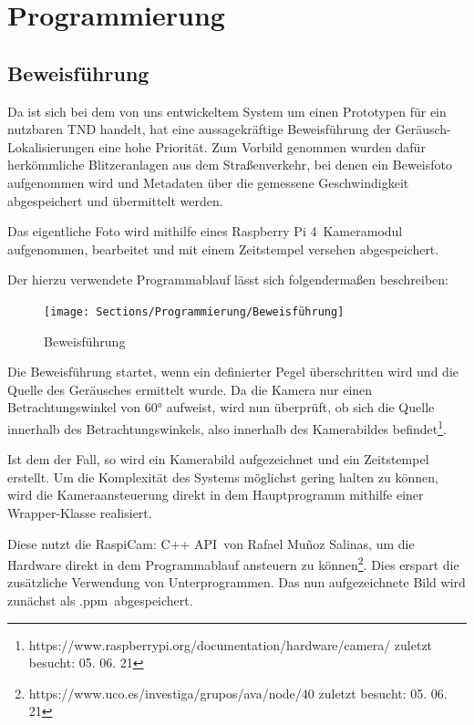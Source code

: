 \section{Programmierung}

\subsection{Beweisführung}

Da ist sich bei dem von uns entwickeltem System um einen Prototypen für ein nutzbaren TND handelt, hat eine aussagekräftige Beweisführung der Geräusch-Lokalisierungen eine hohe Priorität. Zum Vorbild genommen wurden dafür herkömmliche Blitzeranlagen aus dem Straßenverkehr, bei denen ein Beweisfoto aufgenommen wird und Metadaten über die gemessene Geschwindigkeit abgespeichert und übermittelt werden.

Das eigentliche Foto wird mithilfe eines \glqq Raspberry Pi 4\grqq\ Kameramodul aufgenommen, bearbeitet und mit einem Zeitstempel versehen abgespeichert. 

Der hierzu verwendete Programmablauf lässt sich folgendermaßen beschreiben: 

\begin{figure}[!h]
	\begin{center}
		\texttt{[image: Sections/Programmierung/Beweisführung]}
	\end{center}
	\caption{Beweisführung}
	\label{fig:Beweisführung}
\end{figure}

Die Beweisführung startet, wenn ein definierter Pegel überschritten wird und die Quelle des Geräusches ermittelt wurde. Da die Kamera nur einen Betrachtungswinkel von \ang{60} aufweist, wird nun überprüft, ob sich die Quelle innerhalb des Betrachtungswinkels, also innerhalb des Kamerabildes befindet\footnote{https://www.raspberrypi.org/documentation/hardware/camera/ zuletzt besucht: 05. 06. 21}.

Ist dem der Fall, so wird ein Kamerabild aufgezeichnet und ein Zeitstempel erstellt. Um die Komplexität des Systems möglichst gering halten zu können, wird die Kameraansteuerung direkt in dem Hauptprogramm mithilfe einer Wrapper-Klasse realisiert. 

Diese nutzt die \glqq RaspiCam: C++ API\grqq\ von Rafael Muñoz Salinas, um die Hardware direkt in dem Programmablauf ansteuern zu können\footnote{https://www.uco.es/investiga/grupos/ava/node/40 zuletzt besucht: 05. 06. 21}. Dies erspart die zusätzliche Verwendung von Unterprogrammen. Das nun aufgezeichnete Bild wird zunächst als \glqq .ppm\grqq\ abgespeichert. 

